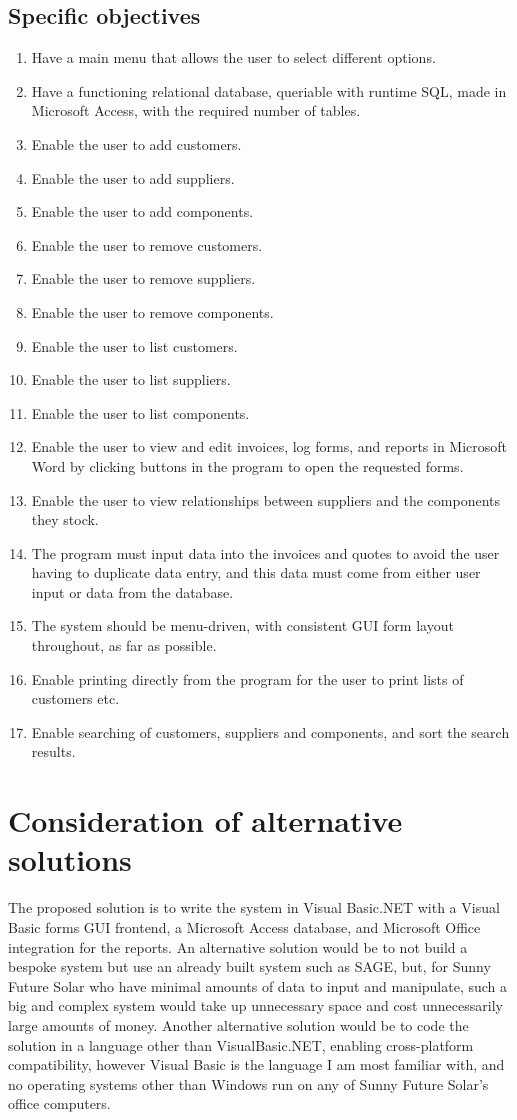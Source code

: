 		\subsection{Specific objectives}
		\begin{enumerate}
			\item{Have a main menu that allows the user to
select different options.}
			\item{Have a functioning relational database,
queriable with runtime SQL, made in Microsoft Access, with the required number of
tables.}
			\item{Enable the user to add customers.}
			\item{Enable the user to add suppliers.}
			\item{Enable the user to add components.}
			\item{Enable the user to remove customers.}
			\item{Enable the user to remove suppliers.}
			\item{Enable the user to remove components.}
			\item{Enable the user to list customers.}
			\item{Enable the user to list suppliers.}
			\item{Enable the user to list components.}
			\item{Enable the user to view and edit invoices, log forms,
and reports in Microsoft Word by clicking buttons in the program to open
the requested forms.}
			\item{Enable the user to view relationships between
suppliers and the components they stock.}
			\item{The program must input data into the invoices
and quotes to avoid the user having to duplicate data entry, and this data
must come from either user input or data from the database.}
			\item{The system should be menu-driven, with
consistent GUI form layout throughout, as far as possible.}
			\item{Enable printing directly from the program for
the user to print lists of customers etc.}
			\item{Enable searching of customers, suppliers and components, and sort the search results.}
		\end{enumerate}
	\section{Consideration of alternative solutions}
The proposed solution is to write the system in Visual Basic.NET with a
Visual Basic forms GUI
frontend, a Microsoft Access database, and Microsoft Office integration for
the reports.  An alternative solution would be to not build a bespoke system but use an already built system such as SAGE, but, for Sunny Future Solar who have minimal amounts of data to input and manipulate, such a big and complex system would take up unnecessary space and cost unnecessarily large amounts of money.  Another alternative solution would be to code the solution in a language other than VisualBasic.NET, enabling cross-platform compatibility, however Visual Basic is the language I am most familiar with, and no operating systems other than Windows run on any of Sunny Future Solar's office computers.
